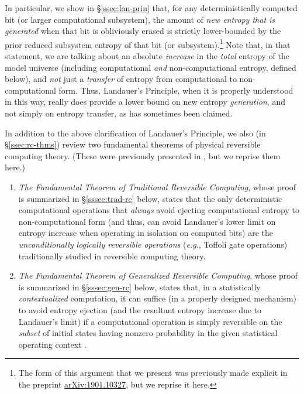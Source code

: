 \documentclass[preprints,article,accept,moreauthors,pdftex]{Definitions/mdpi}
\begin{document}
\begin{paracol}{2}
In particular, we show in \S\ref{ssec:lan-prin} that, for any deterministically computed bit (or larger computational subsystem), the amount of \emph{new entropy that is generated} when that bit is obliviously erased is strictly lower-bounded by the prior reduced subsystem entropy of that bit (or subsystem).\footnote{The form of this argument that we present was previously made explicit in the preprint \href{https://arxiv.org/abs/1901.10327}{arXiv:1901.10327}, but we reprise it here.} Note that, in that statement, we are talking about an absolute \emph{increase} in the \emph{total} entropy of the model universe (including computational \emph{and} non-computational entropy, defined below), and \emph{not} just a \emph{transfer} of entropy from computational to non-computational form.
Thus, Landauer's Principle, when it is properly understood in this way, really does provide a lower bound on new entropy \emph{generation}, and not simply on entropy transfer, as has sometimes been claimed.

In addition to the above clarification of Landauer's Principle, we also (in \S\ref{ssec:rc-thms}) review two fundamental theorems of physical reversible computing theory. (These were previously presented in \cite{Fra17a}, but we reprise them here.)

\begin{enumerate}
    \item \emph{The Fundamental Theorem of Traditional Reversible Computing}, whose proof is summarized in \S\ref{sssec:trad-rc} below, states that the only deterministic computational operations that \emph{always} avoid ejecting computational entropy to non-computational form (and thus, can avoid Landauer's lower limit on entropy increase when operating in isolation on computed bits) are the \emph{unconditionally logically reversible operations} (\textit{e.g.}, Toffoli gate operations) traditionally studied in reversible computing theory.
    
    \item \emph{The Fundamental Theorem of Generalized Reversible Computing}, whose proof is summarized in \S\ref{sssec:gen-rc} below, states that, in a statistically \emph{contextualized} computation, it can suffice (in a properly designed mechanism) to avoid entropy ejection (and the resultant entropy increase due to Landauer's limit) if a computational operation is simply reversible on the \emph{subset} of initial states having nonzero probability in the given statistical operating context \cite{Fra17a}. 
    

\end{enumerate}
\end{paracol}
\end{document}
